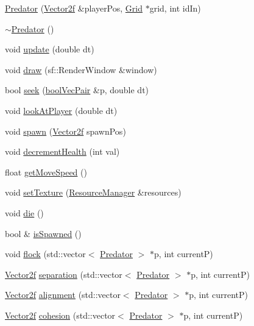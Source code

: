 \begin{DoxyCompactItemize}
\item 
\mbox{\hyperlink{class_predator_abda10d554bf3bc115474a48c1bfa1dc5}{Predator}} (\mbox{\hyperlink{class_vector2f}{Vector2f}} \&player\+Pos, \mbox{\hyperlink{class_grid}{Grid}} $\ast$grid, int id\+In)
\item 
\mbox{\hyperlink{class_predator_a9ef1a4a3a5988d1d1e5844a235b36b8b}{$\sim$\+Predator}} ()
\item 
void \mbox{\hyperlink{class_predator_a17133c4b982c810352e56daa6e0bc5a4}{update}} (double dt)
\item 
void \mbox{\hyperlink{class_predator_abd7de2991eb29a4ae7fa0d57124e4be3}{draw}} (sf\+::\+Render\+Window \&window)
\item 
bool \mbox{\hyperlink{class_predator_a348b20a5648b3079c34dd1a15d12f07a}{seek}} (\mbox{\hyperlink{struct_predator_1_1bool_vec_pair}{bool\+Vec\+Pair}} \&p, double dt)
\item 
void \mbox{\hyperlink{class_predator_af584656b9bef9131f7617ffc13a9b7e6}{look\+At\+Player}} (double dt)
\item 
void \mbox{\hyperlink{class_predator_ac5ed60176f5495793e31d03e6307d539}{spawn}} (\mbox{\hyperlink{class_vector2f}{Vector2f}} spawn\+Pos)
\item 
void \mbox{\hyperlink{class_predator_ac1d720679ac232c291cfc4dac4d887a1}{decrement\+Health}} (int val)
\item 
float \mbox{\hyperlink{class_predator_a2b71c74871cc39b38b1d668879ff1f6e}{get\+Move\+Speed}} ()
\item 
void \mbox{\hyperlink{class_predator_ae2beabc22f0adbe02932e85ad96a84b8}{set\+Texture}} (\mbox{\hyperlink{class_resource_manager}{Resource\+Manager}} \&resources)
\item 
void \mbox{\hyperlink{class_predator_a67e5da42f1a7e8a92e066e2f9402af5e}{die}} ()
\item 
bool \& \mbox{\hyperlink{class_predator_a01db6f18bc0047f66202b29597a77917}{is\+Spawned}} ()
\item 
void \mbox{\hyperlink{class_predator_a5445765daaf7807765d8082eb94b01d8}{flock}} (std\+::vector$<$ \mbox{\hyperlink{class_predator}{Predator}} $>$ $\ast$p, int currentP)
\item 
\mbox{\hyperlink{class_vector2f}{Vector2f}} \mbox{\hyperlink{class_predator_a532e33a8f19a128f4a16018e105f3364}{separation}} (std\+::vector$<$ \mbox{\hyperlink{class_predator}{Predator}} $>$ $\ast$p, int currentP)
\item 
\mbox{\hyperlink{class_vector2f}{Vector2f}} \mbox{\hyperlink{class_predator_afd1be3bbb0b2be00076c938488aafc04}{alignment}} (std\+::vector$<$ \mbox{\hyperlink{class_predator}{Predator}} $>$ $\ast$p, int currentP)
\item 
\mbox{\hyperlink{class_vector2f}{Vector2f}} \mbox{\hyperlink{class_predator_a55f6ee2c3cd0fbe79cd8b7f1329338ed}{cohesion}} (std\+::vector$<$ \mbox{\hyperlink{class_predator}{Predator}} $>$ $\ast$p, int currentP)
\end{DoxyCompactItemize}

